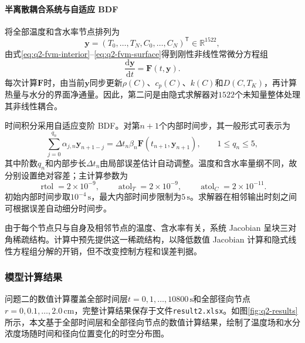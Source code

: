 \documentclass[withoutpreface,bwprint]{cumcmthesis}
\begin{document}
\paragraph{半离散耦合系统与自适应 BDF}
将全部温度和含水率节点排列为
\begin{equation}
\boldsymbol y
=
\left(
T_0,\ldots,T_N,
C_0,\ldots,C_N
\right)^{\mathsf T}
\in\mathbb R^{1522},
\label{eq:q2-state-vector}
\end{equation}
由式\eqref{eq:q2-fvm-interior}--\eqref{eq:q2-fvm-surface}得到刚性非线性常微分方程组
\begin{equation}
\frac{\mathrm d\boldsymbol y}{\mathrm dt}
=
\boldsymbol F(t,\boldsymbol y).
\label{eq:q2-semidiscrete-system}
\end{equation}
每次计算$\boldsymbol F$时，由当前$\boldsymbol y$同步更新$\rho(C)$、$c_p(C)$、$k(C)$和$D(C,T_K)$，再计算热量与水分的界面净通量。因此，第二问是由隐式求解器对$1522$个未知量整体处理其非线性耦合。

时间积分采用自适应变阶 BDF。对第$n+1$个内部时间步，其一般形式可表示为
\begin{equation}
\sum_{j=0}^{q_n}
\alpha_{j,n}\boldsymbol y_{n+1-j}
=
\Delta t_n\beta_n
\boldsymbol F(t_{n+1},\boldsymbol y_{n+1}),
\qquad
1\le q_n\le5,
\label{eq:q2-adaptive-bdf}
\end{equation}
其中阶数$q_n$和内部步长$\Delta t_n$由局部误差估计自动调整。温度和含水率量纲不同，故分别设置绝对容差；主计算参数为
\begin{equation}
\operatorname{rtol}=2\times10^{-9},
\qquad
\operatorname{atol}_T=2\times10^{-9},
\qquad
\operatorname{atol}_C=2\times10^{-11}.
\label{eq:q2-bdf-tolerances}
\end{equation}
初始内部时间步取$10^{-4}\,\mathrm{s}$，最大内部时间步限制为$5\,\mathrm{s}$。求解器在相邻输出时刻之间可根据误差自动细分时间步。

由于每个节点只与自身及相邻节点的温度、含水率有关，系统 Jacobian 呈块三对角稀疏结构。计算中预先提供这一稀疏结构，以降低数值 Jacobian 计算和隐式线性方程组分解的开销，但不改变控制方程和误差判据。

\subsubsection{模型计算结果}

问题二的数值计算覆盖全部时间层$t=0,1,\ldots,10800\,\mathrm{s}$和全部径向节点$r=0,0.1,\ldots,2.0\,\mathrm{cm}$，完整计算结果保存于文件\texttt{result2.xlsx}。如图\ref{fig:q2-results}所示，本文基于全部时间层和全部径向节点的数值计算结果，绘制了温度场和水分浓度场随时间和径向位置变化的时空分布图。
\end{document}
